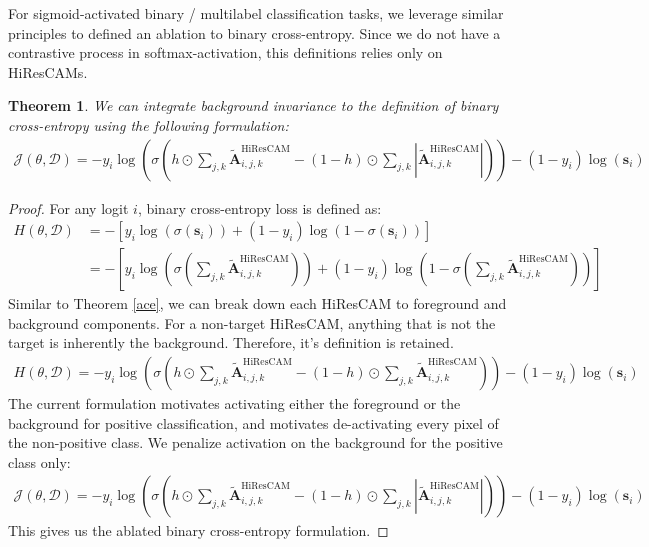 \documentclass{article}
\theoremstyle{plain}
\newtheorem{theorem}{Theorem}[section]
\theoremstyle{definition}
\theoremstyle{remark}
\begin{document}
For sigmoid-activated binary / multilabel classification tasks, we leverage similar principles to defined an ablation to binary cross-entropy. Since we do not have a contrastive process in softmax-activation, this definitions relies only on HiResCAMs.

\begin{theorem}\label{abce}
	We can integrate background invariance to the definition of binary cross-entropy using the following formulation:
	\begin{gather}
		\mathcal{J}(\theta, \mathcal{D}) = - y_i \log \left(\sigma\left(h \odot \sum_{j,k}\tilde{\mathcal{\bm{A}}}_{i,j,k}^{\text{HiResCAM}} - (1-h) \odot \sum_{j,k}|\tilde{\mathcal{\bm{A}}}_{i,j,k}^{\text{HiResCAM}}|\right) \right) - (1 - y_i) \log \left( \bm{s}_i \right)
	\end{gather}
\end{theorem}
\begin{proof} For any logit $i$, binary cross-entropy loss is defined as:
	\begin{align}
		H(\theta, \mathcal{D}) &= -\left[ y_i \log (\sigma(\bm{s}_i)) + (1 - y_i) \log (1 - \sigma(\bm{s}_i)) \right] \\
		&= -\left[ y_i \log \left(\sigma\left(\sum_{j,k}\tilde{\mathcal{\bm{A}}}_{i,j,k}^{\text{HiResCAM}}\right) \right) + (1 - y_i) \log \left(1 - \sigma\left(\sum_{j,k}\tilde{\mathcal{\bm{A}}}_{i,j,k}^{\text{HiResCAM}}\right) \right) \right]
	\end{align}
	Similar to Theorem \ref{ace}, we can break down each HiResCAM to foreground and background components. For a non-target HiResCAM, anything that is not the target is inherently the background. Therefore, it's definition is retained.
	\begin{gather}
		H(\theta, \mathcal{D}) = - y_i \log \left(\sigma\left(h \odot \sum_{j,k}\tilde{\mathcal{\bm{A}}}_{i,j,k}^{\text{HiResCAM}} - (1-h) \odot \sum_{j,k}\tilde{\mathcal{\bm{A}}}_{i,j,k}^{\text{HiResCAM}}\right) \right) - (1 - y_i) \log \left( \bm{s}_i \right)
	\end{gather}
	The current formulation motivates activating either the foreground or the background for positive classification, and motivates de-activating every pixel of the non-positive class. We penalize activation on the background for the positive class only:
	\begin{gather}
		\mathcal{J}(\theta, \mathcal{D}) = - y_i \log \left(\sigma\left(h \odot \sum_{j,k}\tilde{\mathcal{\bm{A}}}_{i,j,k}^{\text{HiResCAM}} - (1-h) \odot \sum_{j,k}|\tilde{\mathcal{\bm{A}}}_{i,j,k}^{\text{HiResCAM}}|\right) \right) - (1 - y_i) \log \left( \bm{s}_i \right)
	\end{gather}
	This gives us the ablated binary cross-entropy formulation.
\end{proof}
\end{document}
